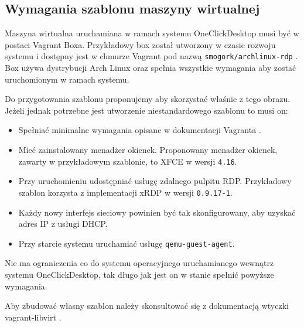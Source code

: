 \documentclass[../opis-rozwiazania.tex]{subfiles}
\begin{document}
\subsection{Wymagania szablonu maszyny wirtualnej}
\label{system_requirements.vagrant_box}
Maszyna wirtualna uruchamiana w ramach systemu OneClickDesktop musi być w postaci Vagrant Boxa.
Przykładowy box został utworzony w czasie rozwoju systemu i dostępny jest w chmurze Vagrant pod nazwą \texttt{smogork/archlinux-rdp} \parencite{ocd-vbox}.
Box używa dystrybucji Arch Linux oraz spełnia wszystkie wymagania aby zostać uruchomionym w ramach systemu.

Do przygotowania szablonu proponujemy aby skorzystać właśnie z tego obrazu.
Jeżeli jednak potrzebne jest utworzenie niestandardowego szablonu to musi on:
\begin{itemize}
	\item Spełniać minimalne wymagania opisane w dokumentacji Vagranta \parencite{vagrant-basebox}.
	\item Mieć zainstalowany menadżer okienek. Proponowany menadżer okienek, zawarty w przykładowym szablonie, to XFCE w wersji \texttt{4.16}.
	\item Przy uruchomieniu udostępniać usługę zdalnego pulpitu RDP. Przykładowy szablon korzysta z implementacji xRDP w wersji \texttt{0.9.17-1}.
	\item Każdy nowy interfejs sieciowy powinien być tak skonfigurowany, aby uzyskać adres IP z usługi DHCP.
	\item Przy starcie systemu uruchamiać usługę \texttt{qemu-guest-agent}.
\end{itemize}
Nie ma ograniczenia co do systemu operacyjnego uruchamianego wewnątrz systemu OneClickDesktop, tak długo jak jest on w stanie spełnić powyższe wymagania.

Aby zbudować własny szablon należy skonsultować się z dokumentacją wtyczki vagrant-libvirt \parencite{vlibvirt-box}.
\end{document}
